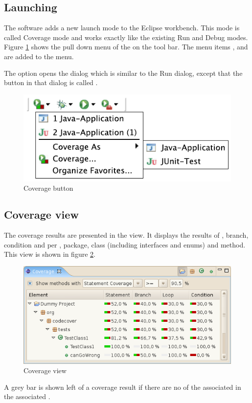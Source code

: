 \subsection{Launching} \label{ui:Launching}
The software adds a new launch mode to the Eclipse workbench. This mode is called Coverage mode and works exactly like the existing Run and Debug modes. Figure \ref{ui_fg:Coverage button} shows the pull down menu of the  on the tool bar. The menu items ,  and  are added to the  menu.
\par
The  option opens the  dialog which is similar to the Run dialog, except that the  button in that dialog is called .
\begin{figure}[hbtp]
 \centering
 \includegraphics[]{images/Coverage_Button/Coverage_Button}
 \caption{Coverage button}
 \label{ui_fg:Coverage button}
\end{figure}
\par

\subsection{Coverage view}
The coverage results are presented in the  view. It displays the results of , branch, condition and  per , package, class (including interfaces and enums) and method. This view is shown in figure \ref{ui_fg:Coverage view}.
\begin{figure}[hbtp]
 \centering
 \includegraphics[]{images/Coverage_View/Coverage_View.png}
 \caption{Coverage view}
 \label{ui_fg:Coverage view}
\end{figure}
\par
A grey bar is shown left of a coverage result if there are no  of the associated  in the associated .

